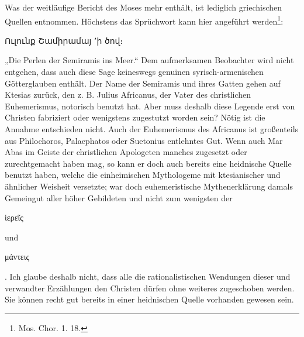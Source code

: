 \documentclass{article}
\begin{document}
Was der weitläufige Bericht des Moses mehr enthält, ist lediglich griechischen Quellen entnommen. Höchstens das Sprüchwort kann hier angeführt werden\footnote{Mos. Chor. 1. 18.}: \begin{armenian}Ուլունք Շամիրամայ ՚ի ծով։\end{armenian} „Die Perlen der Semiramis ins Meer.“ Dem aufmerksamen Beobachter wird nicht entgehen, dass auch diese Sage keineswegs genuinen syrisch-armenischen Götterglauben enthält. Der Name der Semiramis und ihres Gatten gehen auf Ktesias zurück, den z. B. Julius Africanus, der Vater des christlichen Euhemerismus, notorisch benutzt hat. Aber muss deshalb diese Legende erst von Christen fabriziert oder wenigstens zugestutzt worden sein? Nötig ist die Annahme entschieden nicht. Auch der Euhemerismus des Africanus ist großenteils aus Philochoros, Palaephatos oder Suetonius entlehntes Gut. Wenn auch Mar Abas im Geiste der christlichen Apologeten manches zugesetzt oder zurechtgemacht haben mag, so kann er doch auch bereits eine heidnische Quelle benutzt haben, welche die einheimischen Mythologeme mit ktesianischer und ähnlicher Weisheit versetzte; war doch euhemeristische Mythenerklärung damals Gemeingut aller höher Gebildeten und nicht zum wenigsten der \begin{greek}ἱερεῖς\end{greek} und \begin{greek}μάντεις\end{greek}. Ich glaube deshalb nicht, dass alle die rationalistischen Wendungen dieser und verwandter Erzählungen den Christen dürfen ohne weiteres zugeschoben werden. Sie können recht gut bereits in einer heidnischen Quelle vorhanden gewesen sein.
\end{document}
